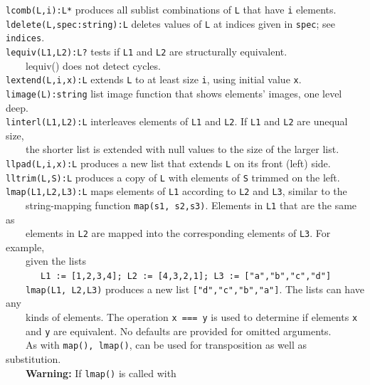 \texttt{lcomb(L,i):L*} produces all sublist combinations of \texttt{L}
that have \texttt{i} elements.\\
\texttt{ldelete(L,spec:string):L} deletes values of \texttt{L} at
indices given in \texttt{spec}; see \texttt{indices}.\\
\texttt{lequiv(L1,L2):L?} tests if \texttt{L1} and \texttt{L2} are
structurally equivalent.\\
 \ \ \ \ lequiv() does not detect cycles.\\
\texttt{lextend(L,i,x):L} extends \texttt{L} to at least size
\texttt{i}, using initial value \texttt{x}.\\
\texttt{limage(L):string} list image function that shows
elements' images, one level deep.\\
\texttt{linterl(L1,L2):L} interleaves elements of \texttt{L1} and
\texttt{L2}. If \texttt{L1} and \texttt{L2} are unequal size,\\
 \ \ \ \ the shorter list is extended with null values to the
size of the larger list.\\
\texttt{llpad(L,i,x):L} produces a new list that extends \texttt{L} on
its front (left) side.\\
\texttt{lltrim(L,S):L} produces a copy of \texttt{L} with elements of
\texttt{S} trimmed on the left.\\
\texttt{lmap(L1,L2,L3):L} maps elements of \texttt{L1} according to
\texttt{L2} and \texttt{L3}, similar to the\\
 \ \ \ \ string-mapping function \texttt{map(s1, s2,s3)}. Elements in
\texttt{L1} that are the same as\\
 \ \ \ \  elements in \texttt{L2} are mapped into the corresponding elements of \texttt{L3}. For
example,\\
 \ \ \ \ given the lists\\
 \ \ \ \ \ \ \ \texttt{L1 := [1,2,3,4]; L2 := [4,3,2,1]; L3 :=
["a","b","c","d"]}\\
 \ \ \ \ \texttt{lmap(L1, L2,L3)} produces a new list
\texttt{["d","c","b","a"]}.
The lists can have any\\
 \ \ \ \ kinds of elements. The operation \texttt{x === y} is used to
determine if elements \texttt{x}\\
 \ \ \ \ and \texttt{y} are equivalent. No defaults are provided for omitted arguments.\\
 \ \ \ \ As
with \texttt{map(), lmap()}, can be used for transposition as well as substitution.\\
 \ \ \ \ \textbf{Warning: }If \texttt{lmap()} is called with
